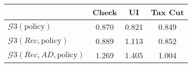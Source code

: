 \begin{tabular}{@{}lccc@{}} 
\toprule 
                          & Check      & UI    & Tax Cut    \\  \midrule 
$\mathcal{G}3(\text{policy})$ & 0.870  & 0.821  & 0.849     \\ 
$\mathcal{G}3(Rec,\text{policy})$ & 0.889  & 1.113  & 0.852     \\ 
$\mathcal{G}3(Rec, AD,\text{policy})$ & 1.269  & 1.405  & 1.004     \\ 
\end{tabular}  
